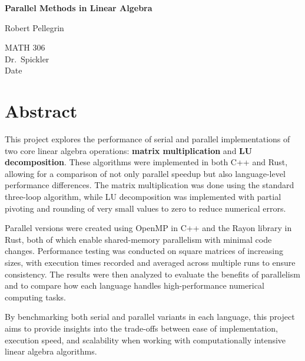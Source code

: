\documentclass[12pt]{article}
\begin{document}
\begin{titlepage}
    \centering
    \vspace*{2in}
    {\Huge\bfseries Parallel Methods in Linear Algebra\par}
    \vspace{1in}
    {\Large Robert Pellegrin\par}
    \vspace{0.5in}
    {\large MATH 306\\ Dr.\ Spickler \\ Date\par}
    \vfill
\end{titlepage}

\newpage
\section*{Abstract}
\begin{singlespace}
    This project explores the performance of serial and parallel implementations of two core linear algebra operations: \textbf{matrix multiplication}
    and \textbf{LU decomposition}. These algorithms were implemented in both C++ and Rust, allowing for a comparison of not only parallel speedup but
    also language-level performance differences. The matrix multiplication was done using the standard three-loop algorithm, while LU decomposition
    was implemented with partial pivoting and rounding of very small values to zero to reduce numerical errors.

    \vspace{1em}

    Parallel versions were created using OpenMP in C++ and the Rayon library in Rust, both of which enable shared-memory parallelism with minimal
    code changes. Performance testing was conducted on square matrices of increasing sizes, with execution times recorded and averaged across
    multiple runs to ensure consistency. The results were then analyzed to evaluate the benefits of parallelism and to compare how each language
    handles high-performance numerical computing tasks.

    \vspace{1em}

    By benchmarking both serial and parallel variants in each language, this project aims to provide insights into the trade-offs between ease of
    implementation, execution speed, and scalability when working with computationally intensive linear algebra algorithms.
\end{singlespace}
\end{document}
